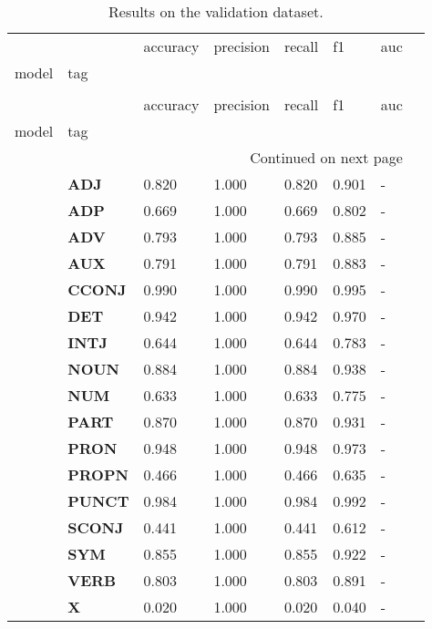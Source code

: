 \begin{longtable}{|l||l||l||l||l||l||l||l|}
\caption{Results on the validation dataset.} \label{tab::ex_2_valid} \\
\toprule
 &  & accuracy & precision & recall & f1 & auc \\
model & tag &  &  &  &  &  \\
\midrule
\endfirsthead
\caption[]{Results on the validation dataset.} \\
\toprule
 &  & accuracy & precision & recall & f1 & auc \\
model & tag &  &  &  &  &  \\
\midrule
\endhead
\midrule
\multicolumn{7}{r}{Continued on next page} \\
\midrule
\endfoot
\bottomrule
\endlastfoot
\multirow[t]{18}{*}{\textbf{Baseline}} & \textbf{ADJ} & 0.820 & 1.000 & 0.820 & 0.901 & - \\
\textbf{} & \textbf{ADP} & 0.669 & 1.000 & 0.669 & 0.802 & - \\
\textbf{} & \textbf{ADV} & 0.793 & 1.000 & 0.793 & 0.885 & - \\
\textbf{} & \textbf{AUX} & 0.791 & 1.000 & 0.791 & 0.883 & - \\
\textbf{} & \textbf{CCONJ} & 0.990 & 1.000 & 0.990 & 0.995 & - \\
\textbf{} & \textbf{DET} & 0.942 & 1.000 & 0.942 & 0.970 & - \\
\textbf{} & \textbf{INTJ} & 0.644 & 1.000 & 0.644 & 0.783 & - \\
\textbf{} & \textbf{NOUN} & 0.884 & 1.000 & 0.884 & 0.938 & - \\
\textbf{} & \textbf{NUM} & 0.633 & 1.000 & 0.633 & 0.775 & - \\
\textbf{} & \textbf{PART} & 0.870 & 1.000 & 0.870 & 0.931 & - \\
\textbf{} & \textbf{PRON} & 0.948 & 1.000 & 0.948 & 0.973 & - \\
\textbf{} & \textbf{PROPN} & 0.466 & 1.000 & 0.466 & 0.635 & - \\
\textbf{} & \textbf{PUNCT} & 0.984 & 1.000 & 0.984 & 0.992 & - \\
\textbf{} & \textbf{SCONJ} & 0.441 & 1.000 & 0.441 & 0.612 & - \\
\textbf{} & \textbf{SYM} & 0.855 & 1.000 & 0.855 & 0.922 & - \\
\textbf{} & \textbf{VERB} & 0.803 & 1.000 & 0.803 & 0.891 & - \\
\textbf{} & \textbf{X} & 0.020 & 1.000 & 0.020 & 0.040 & - \\

\end{longtable}
